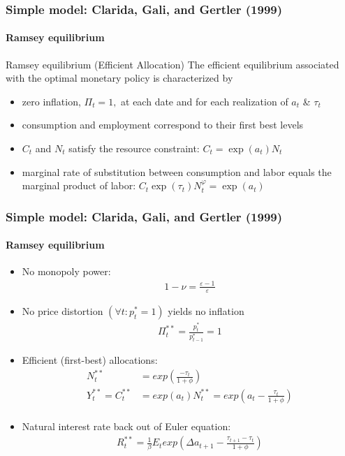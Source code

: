 \documentclass[handout]{beamer}  %
\begin{document}
\begin{frame}\frametitle{Simple model: Clarida, Gali, and Gertler (1999)}\framesubtitle{Ramsey equilibrium}
\begin{block}{Ramsey equilibrium (Efficient Allocation)}
The efficient equilibrium associated with the optimal monetary policy is characterized by
\begin{itemize}
  \item zero inflation, $\Pi _{t}=1,$ at each date and for each realization of $a_{t}$ \& $\tau _{t}$
  \item consumption and employment correspond to their first best levels
  \item $C_{t}$ and $N_{t}$ satisfy the resource constraint: $C_{t}=\exp \left( a_{t}\right) N_{t}$
\item marginal rate of substitution between consumption and labor equals the marginal product of labor:
$C_{t}\exp \left( \tau _{t}\right) N_{t}^{\varphi }=\exp \left(
a_{t}\right)$
\end{itemize}
\end{block}
\end{frame}
\begin{frame}\frametitle{Simple model: Clarida, Gali, and Gertler (1999)}\framesubtitle{Ramsey equilibrium}\footnotesize
\begin{itemize}
  \item No monopoly power:
  \begin{align*}
    1-\nu = \frac{\varepsilon-1}{\varepsilon}  \tag{Eff1}
  \end{align*}
  \item No price distortion $(\forall t: p_t^{*}=1)$ yields no inflation
  \begin{align*}
    \Pi_t^{**} = \frac{p_t^*}{p_{t-1}^*} =1\tag{Eff2}
  \end{align*}
  \item Efficient (first-best) allocations:
  \begin{align*}
    N_t^{**} &= exp\left(\frac{-\tau_t}{1+\phi}\right)\tag{Eff3}\\
    Y_t^{**}=C_t^{**} &= exp(a_t) N_t^{**} = exp\left(a_t - \frac{\tau_t}{1+\phi}\right)\tag{Eff4}\\
  \end{align*}
  \item Natural interest rate back out of Euler equation:
  \begin{align*}
    R_t^{**} = \frac{1}{\beta}E_t exp\left(\Delta a_{t+1} - \frac{\tau_{t+1}-\tau_t}{1+\phi}\right) \tag{Eff5}
  \end{align*}
\end{itemize}

\end{frame}
\end{document}
